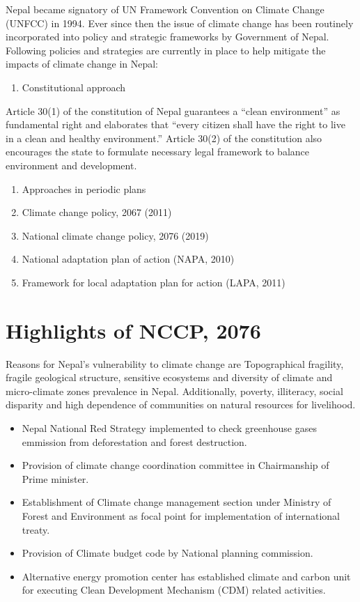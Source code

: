 \documentclass[
  openany]{book}
\providecommand{\tightlist}{%
  \setlength{\itemsep}{0pt}\setlength{\parskip}{0pt}}
\begin{document}
Nepal became signatory of UN Framework Convention on Climate Change (UNFCC) in 1994. Ever since then the issue of climate change has been routinely incorporated into policy and strategic frameworks by Government of Nepal. Following policies and strategies are currently in place to help mitigate the impacts of climate change in Nepal:

\begin{enumerate}
\def\labelenumi{\arabic{enumi}.}
\tightlist
\item
  Constitutional approach
\end{enumerate}

Article 30(1) of the constitution of Nepal guarantees a ``clean environment'' as fundamental right and elaborates that ``every citizen shall have the right to live in a clean and healthy environment.'' Article 30(2) of the constitution also encourages the state to formulate necessary legal framework to balance environment and development.

\begin{enumerate}
\def\labelenumi{\arabic{enumi}.}
\setcounter{enumi}{1}
\tightlist
\item
  Approaches in periodic plans
\item
  Climate change policy, 2067 (2011)
\item
  National climate change policy, 2076 (2019)
\item
  National adaptation plan of action (NAPA, 2010)
\item
  Framework for local adaptation plan for action (LAPA, 2011)
\end{enumerate}

\hypertarget{highlights-of-nccp-2076}{%
\section{Highlights of NCCP, 2076}\label{highlights-of-nccp-2076}}

Reasons for Nepal's vulnerability to climate change are Topographical fragility, fragile geological structure, sensitive ecosystems and diversity of climate and micro-climate zones prevalence in Nepal. Additionally, poverty, illiteracy, social disparity and high dependence of communities on natural resources for livelihood.

\begin{itemize}
\tightlist
\item
  Nepal National Red Strategy implemented to check greenhouse gases emmission from deforestation and forest destruction.
\item
  Provision of climate change coordination committee in Chairmanship of Prime minister.
\item
  Establishment of Climate change management section under Ministry of Forest and Environment as focal point for implementation of international treaty.
\item
  Provision of Climate budget code by National planning commission.
\item
  Alternative energy promotion center has established climate and carbon unit for executing Clean Development Mechanism (CDM) related activities.
\end{itemize}
\end{document}
